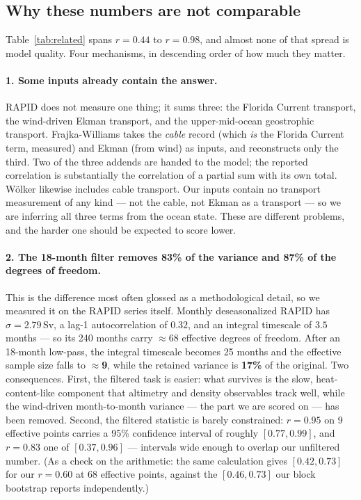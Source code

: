 \documentclass[10pt]{article}
\begin{document}
\subsection{Why these numbers are not comparable}\label{sec:notcomparable}

Table~\ref{tab:related} spans $r=0.44$ to $r=0.98$, and almost none of
that spread is model quality. Four mechanisms, in descending order of
how much they matter.

\paragraph{1. Some inputs already contain the answer.} RAPID does not
measure one thing; it sums three: the Florida Current transport, the
wind-driven Ekman transport, and the upper-mid-ocean geostrophic
transport. Frajka-Williams \cite{fw2015} takes the \emph{cable} record
(which \emph{is} the Florida Current term, measured) and Ekman (from
wind) as inputs, and reconstructs only the third. Two of the three
addends are handed to the model; the reported correlation is
substantially the correlation of a partial sum with its own total.
W\"olker \cite{woelker} likewise includes cable transport. Our inputs
contain no transport measurement of any kind --- not the cable, not
Ekman as a transport --- so we are inferring all three terms from the
ocean state. These are different problems, and the harder one should
be expected to score lower.

\paragraph{2. The 18-month filter removes 83\% of the variance and 87\%
of the degrees of freedom.} This is the difference most often glossed
as a methodological detail, so we measured it on the RAPID series
itself. Monthly deseasonalized RAPID has $\sigma=2.79$\,Sv, a lag-1
autocorrelation of $0.32$, and an integral timescale of $3.5$ months
--- so its 240 months carry $\approx$68 effective degrees of freedom.
After an 18-month low-pass, the integral timescale becomes 25 months
and the effective sample size falls to $\approx$\textbf{9}, while the
retained variance is \textbf{17\%} of the original. Two consequences.
First, the filtered task is easier: what survives is the slow,
heat-content-like component that altimetry and density observables
track well, while the wind-driven month-to-month variance --- the part
we are scored on --- has been removed. Second, the filtered statistic
is barely constrained: $r=0.95$ on 9 effective points carries a
95\% confidence interval of roughly $[0.77, 0.99]$, and $r=0.83$ one of
$[0.37, 0.96]$ --- intervals wide enough to overlap our unfiltered
number. (As a check on the arithmetic: the same calculation gives
$[0.42, 0.73]$ for our $r=0.60$ at 68 effective points, against the
$[0.46, 0.73]$ our block bootstrap reports independently.)
\end{document}

